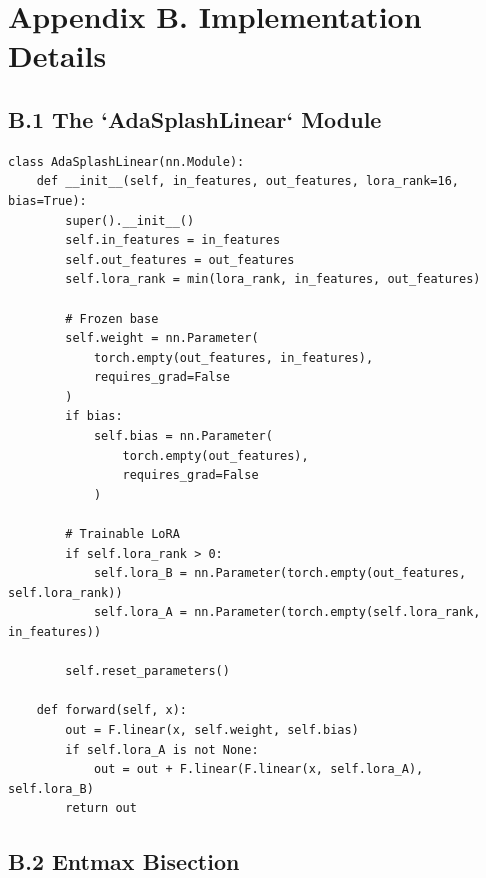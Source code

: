 
\section{Appendix B. Implementation Details}

\subsection{B.1 The `AdaSplashLinear` Module}

\begin{lstlisting}
class AdaSplashLinear(nn.Module):
    def __init__(self, in_features, out_features, lora_rank=16, bias=True):
        super().__init__()
        self.in_features = in_features
        self.out_features = out_features
        self.lora_rank = min(lora_rank, in_features, out_features)
        
        # Frozen base
        self.weight = nn.Parameter(
            torch.empty(out_features, in_features),
            requires_grad=False
        )
        if bias:
            self.bias = nn.Parameter(
                torch.empty(out_features),
                requires_grad=False
            )
        
        # Trainable LoRA
        if self.lora_rank > 0:
            self.lora_B = nn.Parameter(torch.empty(out_features, self.lora_rank))
            self.lora_A = nn.Parameter(torch.empty(self.lora_rank, in_features))
        
        self.reset_parameters()
    
    def forward(self, x):
        out = F.linear(x, self.weight, self.bias)
        if self.lora_A is not None:
            out = out + F.linear(F.linear(x, self.lora_A), self.lora_B)
        return out
\end{lstlisting}

\subsection{B.2 Entmax Bisection}

